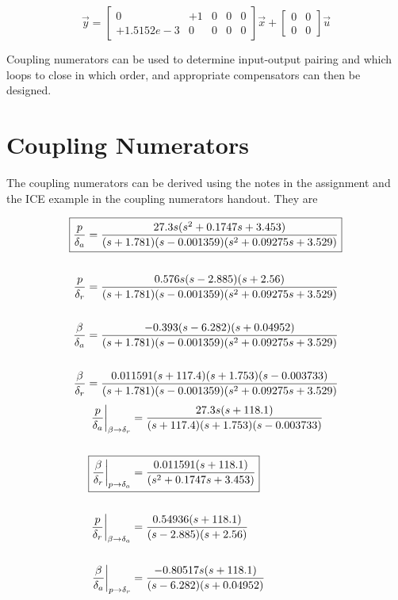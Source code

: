 \documentclass[11pt]{article}
\begin{document}
$$
\vec{y} = \left[ \begin{array}{ccccc}
           0 &         +1 &           0 &           0 &           0 \\
  +1.5152e-3 &          0 &           0 &           0 &           0 \end{array} \right]
\vec{x}+\left[\begin{array}{ccc}
         0 &         0 \\
         0 &         0 \end{array}\right]\vec{u}
$$

\noindent Coupling numerators can be used to determine input-output pairing and which loops to close in which order, and appropriate compensators can then be designed.

\clearpage
\section{Coupling Numerators}

The coupling numerators can be derived using the notes in the assignment and the ICE example in the coupling numerators handout. They are

\begin{gather*}
\begin{split}
\Aboxed{\dfrac{p}{\delta_a} & =\dfrac{27.3 s (s^2 + 0.1747s + 3.453)} {(s+1.781) (s-0.001359) (s^2 + 0.09275s + 3.529)}} \\
\\
\dfrac{p}{\delta_r} & =\dfrac{0.576 s (s-2.885) (s+2.56)}
                      {(s+1.781) (s-0.001359) (s^2 + 0.09275s + 3.529)} \\
\\
\dfrac{\beta}{\delta_a} & =\dfrac{-0.393 (s-6.282) (s+0.04952)}
                          {(s+1.781) (s-0.001359) (s^2 + 0.09275s + 3.529)} \\
\\
\dfrac{\beta}{\delta_r} & =\dfrac{0.011591 (s+117.4) (s+1.753) (s-0.003733)}
                          {(s+1.781) (s-0.001359) (s^2 + 0.09275s + 3.529)} \\
\end{split}
\end{gather*}
\begin{gather*}
\begin{split}
\dfrac{p}{\delta_a}\biggr\rvert_{\beta \rightarrow \delta_r}
             & = \dfrac{27.3 s (s+118.1)}{(s+117.4) (s+1.753) (s-0.003733)} \\
\\
\Aboxed{\dfrac{\beta}{\delta_r}\biggr\rvert_{p \rightarrow \delta_a}
             & = \dfrac{0.011591 (s+118.1)}{(s^2 + 0.1747s + 3.453)}} \\
\\
\dfrac{p}{\delta_r}\biggr\rvert_{\beta \rightarrow \delta_a}
             & = \dfrac{0.54936 (s+118.1)}{(s-2.885) (s+2.56)} \\
\\
\dfrac{\beta}{\delta_a}\biggr\rvert_{p \rightarrow \delta_r}
             & = \dfrac{-0.80517 s (s+118.1)}{(s-6.282) (s+0.04952)} \\
\end{split}
\end{gather*}
\end{document}
